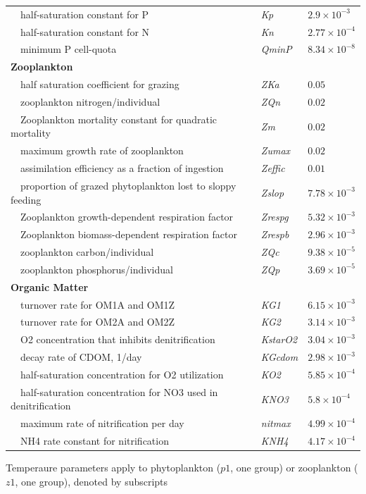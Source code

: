 \documentclass[letterpaper,12pt,oneside]{article}\usepackage[]{graphicx}\usepackage[]{color}
\begin{document}
\begin{table}[!tbp]
{\begin{center}
\begin{tabular}{lll}
~~half-saturation constant for P&\textit{Kp}&$2.9\times 10^{-3}$\tabularnewline
~~half-saturation constant for N&\textit{Kn}&$2.77\times 10^{-4}$\tabularnewline
~~minimum P cell-quota&\textit{QminP}&$8.34\times 10^{-8}$\tabularnewline
\hline
{\bfseries Zooplankton}&&\tabularnewline
~~half saturation coefficient for grazing&\textit{ZKa}&$0.05$\tabularnewline
~~zooplankton nitrogen/individual&\textit{ZQn}&$0.02$\tabularnewline
~~Zooplankton mortality constant for quadratic mortality&\textit{Zm}&$0.02$\tabularnewline
~~maximum growth rate of zooplankton&\textit{Zumax}&$0.02$\tabularnewline
~~assimilation efficiency as a fraction of ingestion&\textit{Zeffic}&$0.01$\tabularnewline
~~proportion of grazed phytoplankton lost to sloppy feeding&\textit{Zslop}&$7.78\times 10^{-3}$\tabularnewline
~~Zooplankton growth-dependent respiration factor&\textit{Zrespg}&$5.32\times 10^{-3}$\tabularnewline
~~Zooplankton biomass-dependent respiration factor&\textit{Zrespb}&$2.96\times 10^{-3}$\tabularnewline
~~zooplankton carbon/individual&\textit{ZQc}&$9.38\times 10^{-5}$\tabularnewline
~~zooplankton phosphorus/individual&\textit{ZQp}&$3.69\times 10^{-5}$\tabularnewline
\hline
{\bfseries Organic Matter}&&\tabularnewline
~~turnover rate for OM1A and OM1Z&\textit{KG1}&$6.15\times 10^{-3}$\tabularnewline
~~turnover rate for OM2A and OM2Z&\textit{KG2}&$3.14\times 10^{-3}$\tabularnewline
~~O2 concentration that inhibits denitrification&\textit{KstarO2}&$3.04\times 10^{-3}$\tabularnewline
~~decay rate of CDOM, 1/day&\textit{KGcdom}&$2.98\times 10^{-3}$\tabularnewline
~~half-saturation concentration for O2 utilization&\textit{KO2}&$5.85\times 10^{-4}$\tabularnewline
~~half-saturation concentration for NO3 used in denitrification&\textit{KNO3}&$5.8\times 10^{-4}$\tabularnewline
~~maximum rate of nitrification per day&\textit{nitmax}&$4.99\times 10^{-4}$\tabularnewline
~~NH4 rate constant for nitrification&\textit{KNH4}&$4.17\times 10^{-4}$\tabularnewline
\hline
\end{tabular}\end{center}}

\footnotesize *Temperaure parameters apply to phytoplankton ($p1$, one group) or zooplankton ($z1$, one group), denoted by subscripts\end{table}
\end{document}
